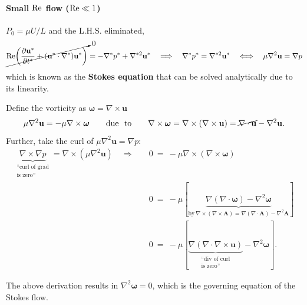 \documentclass[a4paper]{article}
\begin{document}
\paragraph{Small $\rm Re$ flow ($ \rm Re \ll 1$)} $P_0 = \mu U/L$ and the L.H.S. eliminated,
\[ 
    \cancelto{0}{{\rm Re}\bigg(\frac{\partial \mathbf{u^{*}}}{\partial t^{*}} + (\mathbf{u^{*}}\cdot \nabla^{*})\mathbf{u^{*}} \bigg)} = -\nabla^{*} p^{*} + \nabla^{*2}\mathbf{u^{*}}
    \quad \Longrightarrow \quad
    \nabla^{*} p^{*} = \nabla^{*2}\mathbf{u^{*}}
    \quad \Longleftrightarrow \quad
    \mu \nabla^2 \mathbf{u} = \nabla p
\]
which is known as the \textbf{Stokes equation} that can be solved analytically due to its linearity. 
\begin{tcolorbox}[breakable, title={\textbf{Governing Equation of Stokes Flow}}]
Define the vorticity as $\boldsymbol{\omega} = \nabla \times \mathbf{u}$
    \[
        \mu \nabla^2 \mathbf{u} = - \mu \nabla \times \boldsymbol{\omega}
        \quad \quad \text{due \ to} \quad \quad
        \nabla \times \boldsymbol{\omega} = \nabla \times (\nabla \times \mathbf{u}) = \cancel{\nabla \cdot \mathbf{u}} - \nabla^2 \mathbf{u}.        
    \]
Further, take the curl of $\mu \nabla^2 \mathbf{u} = \nabla p$:
    \begin{align*}
         \underbrace{\nabla \times \nabla p}_{\substack{\text{``curl of grad} \\ \text{is zero''}}} = \nabla \times (\mu \nabla^2 \mathbf{u})
         \quad \Longrightarrow \quad 
         & 0 \ = \ -\mu \nabla \times (\nabla \times \boldsymbol{\omega}) \\[-2em]
         & 0 \ = \ -\mu [ \underbrace{\nabla (\nabla \cdot \boldsymbol{\omega}) - \nabla^2 \boldsymbol{\omega}}_{\text{by} \ \nabla \times \left( \nabla \times \textbf{A} \right) = \nabla \left( \nabla \cdot \textbf{A} \right) -\nabla^2 \textbf{A}}] \\
         & 0 \ = \ -\mu [\underbrace{\nabla (\nabla \cdot \nabla \times \mathbf{u})}_{\substack{\text{``div of curl} \\ \text{is zero''}}} - \nabla^2 \boldsymbol{\omega}] .
    \end{align*}

The above derivation results in $\nabla^2 \boldsymbol{\omega} = 0$, which is the governing equation of the Stokes flow.
\end{tcolorbox}
\end{document}
